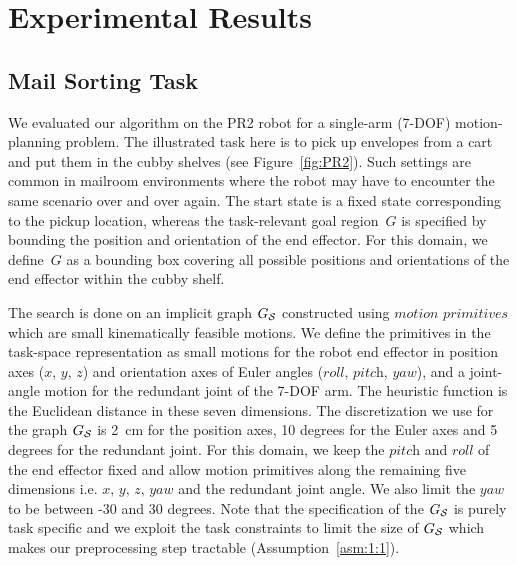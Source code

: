 \documentclass[a4paper]{report}
\begin{document}
\section{Experimental Results}
\label{sec:eval1}

\subsection{Mail Sorting Task}

We evaluated our algorithm on the PR2 robot for a single-arm (7-DOF) motion-planning problem. The illustrated task here is to pick up envelopes from a cart and put them in the cubby shelves (see Figure~\ref{fig:PR2}). Such settings are common in mailroom environments where the robot may have to encounter the same scenario over and over again. The start state is a fixed state corresponding to the pickup location, whereas the task-relevant goal region~$G$ is specified by bounding the position and orientation of the end effector. For this domain, we define~$G$ as a bounding box covering all possible positions and orientations of the end effector within the cubby shelf.

The search is done on an implicit graph $G_\mathcal{S}$ constructed using $\textit{motion primitives}$ which are small kinematically feasible motions. We define the primitives in the task-space representation as small motions for the robot end effector in position axes ($\textit{x, y, z}$) and orientation axes of Euler angles ($\textit{roll, pitch, yaw}$), and a joint-angle motion for the redundant joint of the 7-DOF arm. 
The heuristic function is the Euclidean distance in these seven dimensions. The discretization we use for the graph $G_\mathcal{S}$ is 2~cm for the position axes, 10 degrees for the Euler axes and 5 degrees for the redundant joint. 
For this domain, we keep the $\textit{pitch}$ and $\textit{roll}$ of the end effector fixed and allow motion primitives along the remaining five dimensions i.e. $\textit{x, y, z, yaw}$ and the redundant joint angle. We also limit the $\textit{yaw}$ to be between -30 and 30 degrees. Note that the specification of the $G_\mathcal{S}$ is purely task specific and we exploit the task constraints to limit the size of $G_\mathcal{S}$ which makes our preprocessing step tractable (Assumption~\ref{asm:1:1}).
\end{document}

